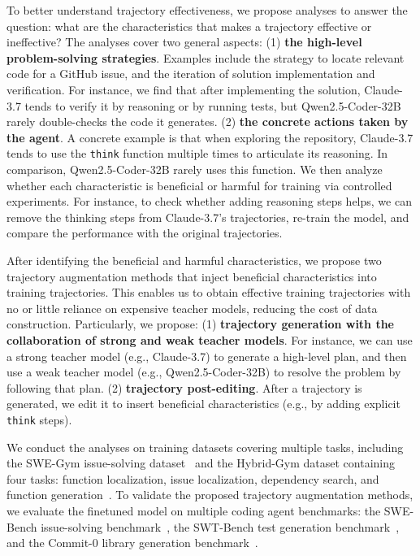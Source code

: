 To better understand trajectory effectiveness, we propose analyses to answer the question: what are the characteristics that makes a trajectory effective or ineffective?
The analyses cover two general aspects:
(1) \textbf{the high-level problem-solving strategies}. Examples include the strategy to locate relevant code for a GitHub issue, and the iteration of solution implementation and verification. 
For instance, we find that after implementing the solution, Claude-3.7 tends to verify it by reasoning or by running tests, but Qwen2.5-Coder-32B~\cite{qwen25coder} rarely double-checks the code it generates.
(2) \textbf{the concrete actions taken by the agent}. A concrete example is that when exploring the repository, Claude-3.7 tends to use the \texttt{think} function multiple times to articulate its reasoning. In comparison, Qwen2.5-Coder-32B rarely uses this function.
We then analyze whether each characteristic is beneficial or harmful for training via controlled experiments.
For instance, to check whether adding reasoning steps helps, we can remove the thinking steps from Claude-3.7's trajectories, re-train the model, and compare the performance with the original trajectories.


After identifying the beneficial and harmful characteristics, we propose two trajectory augmentation methods that inject beneficial characteristics into training trajectories.
This enables us to obtain effective training trajectories with no or little reliance on expensive teacher models, reducing the cost of data construction.
Particularly, we propose:
(1) \textbf{trajectory generation with the collaboration of strong and weak teacher models}. For instance, we can use a strong teacher model (e.g., Claude-3.7) to generate a high-level plan, and then use a weak teacher model (e.g., Qwen2.5-Coder-32B) to resolve the problem by following that plan.
(2) \textbf{trajectory post-editing}. After a trajectory is generated, we edit it to insert beneficial characteristics (e.g., by adding explicit \texttt{think} steps).


We conduct the analyses on training datasets covering multiple tasks, including the SWE-Gym issue-solving dataset~\cite{swegym} and the Hybrid-Gym dataset containing four tasks: function localization, issue localization, dependency search, and function generation~\cite{hybrid-gym}.
To validate the proposed trajectory augmentation methods, we evaluate the finetuned model on multiple coding agent benchmarks: the SWE-Bench issue-solving benchmark~\cite{swebench}, the SWT-Bench test generation benchmark~\cite{swt-bench}, and the Commit-0 library generation benchmark~\cite{commit0}.



